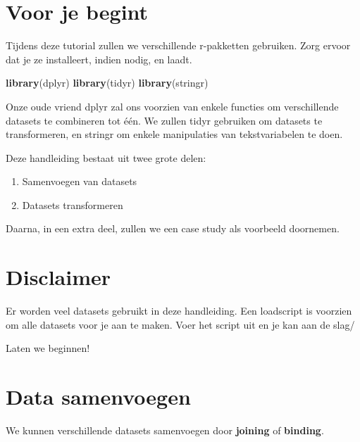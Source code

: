 \documentclass[]{tufte-book}
\newenvironment{Shaded}{}{}
\newcommand{\KeywordTok}[1]{\textcolor[rgb]{0.00,0.44,0.13}{\textbf{#1}}}
\newcommand{\NormalTok}[1]{#1}
\providecommand{\tightlist}{%
  \setlength{\itemsep}{0pt}\setlength{\parskip}{0pt}}
\begin{document}
\hypertarget{voor-je-begint-3}{%
\section{Voor je begint}\label{voor-je-begint-3}}

Tijdens deze tutorial zullen we verschillende r-pakketten gebruiken. Zorg ervoor dat je ze installeert, indien nodig, en laadt.

\begin{Shaded}
\begin{Highlighting}[]
\KeywordTok{library}\NormalTok{(dplyr)}
\KeywordTok{library}\NormalTok{(tidyr)}
\KeywordTok{library}\NormalTok{(stringr)}
\end{Highlighting}
\end{Shaded}

Onze oude vriend dplyr zal ons voorzien van enkele functies om verschillende datasets te combineren tot één. We zullen tidyr gebruiken om datasets te transformeren, en stringr om enkele manipulaties van tekstvariabelen te doen.

Deze handleiding bestaat uit twee grote delen:

\begin{enumerate}
\def\labelenumi{\arabic{enumi}.}
\tightlist
\item
  Samenvoegen van datasets
\item
  Datasets transformeren
\end{enumerate}

Daarna, in een extra deel, zullen we een case study als voorbeeld doornemen.

\hypertarget{disclaimer-1}{%
\section*{Disclaimer}\label{disclaimer-1}}

Er worden veel datasets gebruikt in deze handleiding. Een loadscript is voorzien om alle datasets voor je aan te maken. Voer het script uit en je kan aan de slag/

Laten we beginnen!

\hypertarget{data-samenvoegen}{%
\section{Data samenvoegen}\label{data-samenvoegen}}

We kunnen verschillende datasets samenvoegen door \textbf{joining} of \textbf{binding}.
\end{document}
